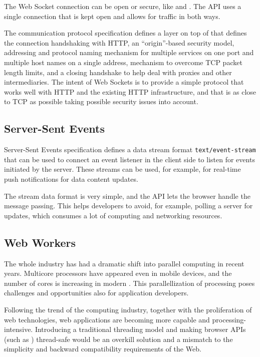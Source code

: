 The Web Socket connection can be open or secure, like  and
. The API uses a single  connection that is kept
open and allows for traffic in both ways. \cite{WebSockets,
  WebSocketProtocol}

The communication protocol specification defines a layer on top of
 that defines the connection handshaking with HTTP, an
``origin''-based security model, addressing and protocol naming
mechanism for multiple services on one port and multiple host names on
a single  address, mechanism to overcome TCP packet length
limits, and a closing handshake to help deal with proxies and other
intermediaries. The intent of Web Sockets is to provide a simple
protocol that works well with HTTP and the existing HTTP
infrastructure, and that is as close to TCP as possible taking
possible security issues into account. \cite{WebSocketProtocol}

\subsection{Server-Sent Events}

Server-Sent Events specification \cite{ServerSentEvents} defines a
data stream format \texttt{text/event-stream} that can be used to
connect an event listener in the client side to listen for events
initiated by the server. These streams can be used, for example, for
real-time push notifications for data content updates.

The stream data format is very simple, and the API lets the browser
handle the message passing. This helps developers to avoid, for
example, polling a server for updates, which consumes a lot of
computing and networking resources.

\subsection{Web Workers}
\label{section:webworkers}

The whole  industry has had a dramatic shift into parallel
computing in recent years. Multicore processors have appeared even in
mobile devices, and the number of cores is increasing in modern
. This parallellization of processing poses challenges and
opportunities also for application developers. \cite{asanovic2009view}

Following the trend of the computing industry, together with the
proliferation of web technologies, web applications are becoming more
capable and processing-intensive. Introducing a traditional threading
model and making browser APIs (such as ) thread-safe would
be an overkill solution and a mismatch to the simplicity and backward
compatibility requirements of the Web.

